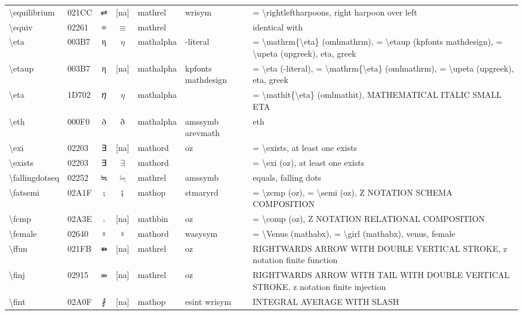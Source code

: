 \documentclass[a4paper,landscape]{article}
\begin{document}
\begin{longtable}{llcclll}
\textbackslash{}equilibrium & 021CC & ⇌ & [na] & mathrel & wrisym & = \textbackslash{}rightleftharpoons,  right harpoon over left \\
\textbackslash{}equiv & 02261 & ≡ & $\equiv$ & mathrel &  & identical with \\
\textbackslash{}eta & 003B7 & η & $\eta$ & mathalpha & -literal & = \textbackslash{}mathrm\{\textbackslash{}eta\} (omlmathrm), = \textbackslash{}etaup (kpfonts mathdesign), = \textbackslash{}upeta (upgreek), eta, greek \\
\textbackslash{}etaup & 003B7 & η & [na] & mathalpha & kpfonts mathdesign & = \textbackslash{}eta (-literal), = \textbackslash{}mathrm\{\textbackslash{}eta\} (omlmathrm),  = \textbackslash{}upeta (upgreek),  eta,  greek \\
\textbackslash{}eta & 1D702 & 𝜂 & $\eta$ & mathalpha &  & = \textbackslash{}mathit\{\textbackslash{}eta\} (omlmathit), MATHEMATICAL ITALIC SMALL ETA \\
\textbackslash{}eth & 000F0 & ð & $\eth$ & mathalpha & amssymb arevmath & eth \\
\textbackslash{}exi & 02203 & ∃ & [na] & mathord & oz & = \textbackslash{}exists,  at least one exists \\
\textbackslash{}exists & 02203 & ∃ & $\exists$ & mathord &  & = \textbackslash{}exi (oz), at least one exists \\
\textbackslash{}fallingdotseq & 02252 & ≒ & $\fallingdotseq$ & mathrel & amssymb & equals, falling dots \\
\textbackslash{}fatsemi & 02A1F & ⨟ & $\fatsemi$ & mathop & stmaryrd & = \textbackslash{}zcmp (oz), = \textbackslash{}semi (oz),  Z NOTATION SCHEMA COMPOSITION \\
\textbackslash{}fcmp & 02A3E & ⨾ & [na] & mathbin & oz & = \textbackslash{}comp (oz), Z NOTATION RELATIONAL COMPOSITION \\
\textbackslash{}female & 02640 & \textsf ♀ & $\female$ & mathord & wasysym & = \textbackslash{}Venus (mathabx), = \textbackslash{}girl (mathabx), venus, female \\
\textbackslash{}ffun & 021FB & ⇻ & [na] & mathrel & oz & RIGHTWARDS ARROW WITH DOUBLE VERTICAL STROKE, z notation finite function \\
\textbackslash{}finj & 02915 & ⤕ & [na] & mathrel & oz & RIGHTWARDS ARROW WITH TAIL WITH DOUBLE VERTICAL STROKE, z notation finite injection \\
\textbackslash{}fint & 02A0F & ⨏ & [na] & mathop & esint wrisym & INTEGRAL AVERAGE WITH SLASH \\

\end{longtable}
\end{document}
